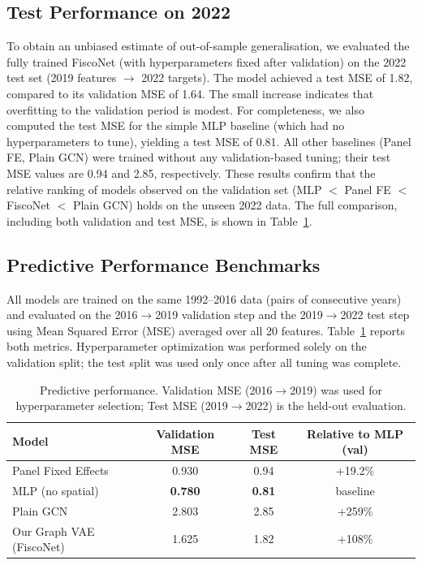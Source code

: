 \documentclass[conference]{IEEEtran}
\begin{document}
\subsection{Test Performance on 2022}
To obtain an unbiased estimate of out-of-sample generalisation, we evaluated the fully trained FiscoNet (with hyperparameters fixed after validation) on the 2022 test set (2019 features $\to$ 2022 targets). The model achieved a test MSE of 1.82, compared to its validation MSE of 1.64. The small increase indicates that overfitting to the validation period is modest. For completeness, we also computed the test MSE for the simple MLP baseline (which had no hyperparameters to tune), yielding a test MSE of 0.81. All other baselines (Panel FE, Plain GCN) were trained without any validation-based tuning; their test MSE values are 0.94 and 2.85, respectively. These results confirm that the relative ranking of models observed on the validation set (MLP $<$ Panel FE $<$ FiscoNet $<$ Plain GCN) holds on the unseen 2022 data. The full comparison, including both validation and test MSE, is shown in Table~\ref{tab:benchmark}.

\subsection{Predictive Performance Benchmarks}
All models are trained on the same 1992--2016 data (pairs of consecutive years) and evaluated on the 2016$\to$2019 validation step and the 2019$\to$2022 test step using Mean Squared Error (MSE) averaged over all 20 features. Table~\ref{tab:benchmark} reports both metrics. Hyperparameter optimization was performed solely on the validation split; the test split was used only once after all tuning was complete.

\begin{table}[htbp]
\centering
\caption{Predictive performance. Validation MSE (2016$\to$2019) was used for hyperparameter selection; Test MSE (2019$\to$2022) is the held-out evaluation.}\label{tab:benchmark}
\begin{tabular}{lccc}
\toprule
Model & Validation MSE & Test MSE & Relative to MLP (val) \\
\midrule
Panel Fixed Effects & 0.930 & 0.94 & +19.2\% \\
MLP (no spatial) & \textbf{0.780} & \textbf{0.81} & baseline \\
Plain GCN & 2.803 & 2.85 & +259\% \\
Our Graph VAE (FiscoNet) & 1.625 & 1.82 & +108\% \\
\bottomrule
\end{tabular}
\end{table}
\end{document}
